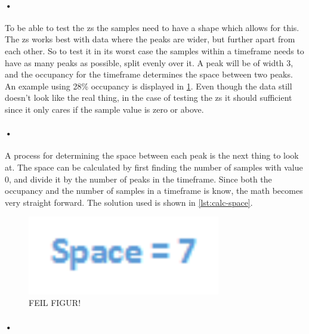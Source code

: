 \documentclass[a4paper, 12pt]{report}
\begin{document}
\paragraph{•}
To be able to test the \gls{zs} the samples need to have a shape which allows for this.
The \gls{zs} works best with data where the peaks are wider, but further apart from each other.
So to test it in its worst case the samples within a timeframe needs to have as many peaks as possible, split evenly over it.
A peak will be of width 3, and the occupancy for the timeframe determines the space between two peaks.
An example using 28\% occupancy is displayed in \ref{fig:normal-data-shape}.
Even though the data still doesn't look like the real thing, in the case of testing the \gls{zs} it should sufficient since it only cares if the sample value is zero or above.

\paragraph{•}
A process for determining the space between each peak is the next thing to look at.
The space can be calculated by first finding the number of samples with value 0, and divide it by the number of peaks in the timeframe.
Since both the occupancy and the number of samples in a timeframe is know, the math becomes very straight forward.
The solution used is shown in \ref{lst:calc-space}.

\begin{figure}[h!]
	\centering
		\includegraphics[width=0.75\textwidth]{images/normal-data-shape.png}
		\caption{FEIL FIGUR!}
		\label{fig:normal-data-shape}
\end{figure}

\paragraph{•}
\begin{minipage}{\linewidth}

\end{minipage}
\end{document}
